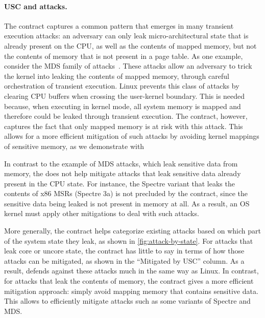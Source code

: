 \paragraph{USC and attacks.}

The contract captures a common pattern that emerges in many transient
execution attacks: an adversary can only leak micro-architectural
state that is already present on the CPU, as well as the contents
of mapped memory, but not the contents of memory that is not
present in a page table.  As one example, consider the MDS family
of attacks~\cite{canella:fallout, schwarz:zombieload,schaik:ridl}.
These attacks allow an adversary to trick the kernel into leaking the
contents of mapped memory, through careful orchestration of transient
execution.  Linux prevents this class of attacks by clearing CPU buffers
when crossing the user-kernel boundary.  This is needed because, when
executing in kernel mode, all system memory is mapped and therefore
could be leaked through transient execution.  The contract, however,
captures the fact that only mapped memory is at risk with this attack.
This allows for a more efficient mitigation of such attacks by avoiding kernel mappings of sensitive memory, as we demonstrate with \sys

In contrast to the example of MDS attacks, which leak sensitive data
from memory, the \contract{} does not help mitigate attacks that leak
sensitive data already present in the CPU state.  For instance, the
Spectre variant that leaks the contents of x86 MSRs (Spectre 3a) is not
precluded by the contract, since the sensitive data being leaked is not
present in memory at all.  As a result, an OS kernel must apply other
mitigations to deal with such attacks.

More generally, the contract helps categorize existing attacks
based on which part of the system state they leak, as shown in
\autoref{fig:attack-by-state}.  For attacks that leak core or uncore
state, the contract has little to say in terms of how those attacks
can be mitigated, as shown in the ``Mitigated by USC'' column.  As a
result, \sys defends against these attacks much in the same way as Linux.
In contrast, for attacks that leak the contents of memory, the contract
gives a more efficient mitigation approach: simply avoid mapping memory
that contains sensitive data.  This allows \sys to efficiently mitigate
attacks such as some variants of Spectre and MDS.

